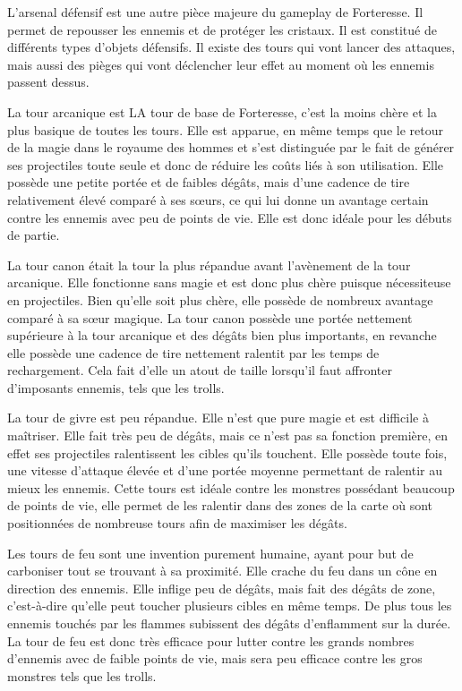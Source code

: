 \documentclass[a4paper, 12pt]{article}
\begin{document}
			L’arsenal défensif est une autre pièce majeure du gameplay de Forteresse. Il permet de repousser les ennemis et de protéger les cristaux. Il est constitué de différents types d’objets défensifs. Il existe des tours qui vont lancer des attaques, mais aussi des pièges qui vont déclencher leur effet au moment où les ennemis passent dessus. 
\par La tour arcanique est LA tour de base de Forteresse, c’est la moins ch\`ere et la plus basique de toutes les tours. Elle est apparue, en même temps que le retour de la magie dans le royaume des hommes et s’est distinguée par le fait de générer ses projectiles toute seule et donc de réduire les co\^uts liés à son utilisation. Elle possède une petite portée et de faibles dégâts, mais d’une cadence de tire relativement élevé comparé à ses sœurs, ce qui lui donne un avantage certain contre les ennemis avec peu de points de vie. Elle est donc idéale pour les débuts de partie.
\par La tour canon était la tour la plus répandue avant l’avènement de la tour arcanique. Elle fonctionne sans magie et est donc plus ch\`ere puisque nécessiteuse en projectiles. Bien qu’elle soit plus ch\`ere, elle possède de nombreux avantage comparé à sa sœur magique. La tour canon possède une portée nettement supérieure à la tour arcanique et des dégâts bien plus importants, en revanche elle possède une cadence de tire nettement ralentit par les temps de rechargement. Cela fait d’elle un atout de taille lorsqu’il faut affronter d’imposants ennemis, tels que les trolls.
\par La tour de givre est peu répandue. Elle n’est que pure magie et est difficile à ma\^itriser. Elle fait très peu de dégâts, mais ce n’est pas sa fonction première, en effet ses projectiles ralentissent les cibles qu’ils touchent. Elle possède toute fois, une vitesse d’attaque élevée et d’une portée moyenne permettant de ralentir au mieux les ennemis. Cette tours est idéale contre les monstres possédant beaucoup de points de vie, elle permet de les ralentir dans des zones de la carte o\`u sont positionnées de nombreuse tours afin de maximiser les dégâts.
\par Les tours de feu sont une invention purement humaine, ayant pour but de carboniser tout se trouvant à sa proximité. Elle crache du feu dans un cône en direction des ennemis. Elle inflige peu de dégâts, mais fait des dégâts de zone, c’est-à-dire qu’elle peut toucher plusieurs cibles en même temps. De plus tous les ennemis touchés par les flammes subissent des dégâts d’enflamment sur la durée. La tour de feu est donc très efficace pour lutter contre les grands nombres d’ennemis avec de faible points de vie, mais sera peu efficace contre les gros monstres tels que les trolls.
\end{document}
